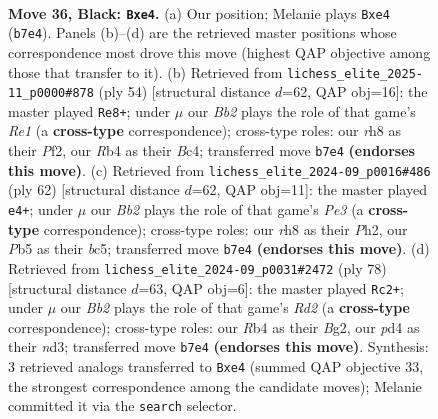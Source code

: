 \documentclass[11pt]{article}
\begin{document}
\begin{figure}[p]\centering
\begin{subfigure}{0.46\textwidth}\centering
\resizebox{\linewidth}{!}{%
\newchessgame
\chessboard[
  setfen={7R/1b3pp1/4p1k1/1p5p/1r1PBP1P/2N1P1P1/8/6K1 b - - 0 36},
  showmover=false,
  pgfstyle=straightmove, color=movearrow, markmove={b7-e4}
]}
\caption{}
\end{subfigure}\hfill
\begin{subfigure}{0.46\textwidth}\centering
\resizebox{\linewidth}{!}{%
\newchessgame
\chessboard[
  setfen={6k1/pp3pp1/2p2p2/2P5/1PBr1b2/7P/P4P1P/4R1K1 w - - 0 28},
  showmover=false,
  pgfstyle=straightmove, color=movearrow, markmove={e1-e8}
]}
\caption{}
\end{subfigure}
\\[4pt]
\begin{subfigure}{0.46\textwidth}\centering
\resizebox{\linewidth}{!}{%
\newchessgame
\chessboard[
  setfen={5r2/p1R5/1p3B1p/2bk2p1/P5P1/4PK2/5P1P/8 w - - 1 32},
  showmover=false,
  pgfstyle=straightmove, color=movearrow, markmove={e3-e4}
]}
\caption{}
\end{subfigure}\hfill
\begin{subfigure}{0.46\textwidth}\centering
\resizebox{\linewidth}{!}{%
\newchessgame
\chessboard[
  setfen={8/2k4p/1p4p1/1K3p2/PP1r4/3n2P1/3R1PBP/8 w - - 2 40},
  showmover=false,
  pgfstyle=straightmove, color=movearrow, markmove={d2-c2}
]}
\caption{}
\end{subfigure}
\caption{\textbf{Move 36, Black: \texttt{Bxe4}.} (a) Our position; Melanie plays \texttt{Bxe4} (\texttt{b7e4}). Panels (b)--(d) are the retrieved master positions whose correspondence most drove this move (highest QAP objective among those that transfer to it). (b) Retrieved from \texttt{lichess\_elite\_2025-11\_p0000\#878} (ply 54) [structural distance $d$=62, QAP obj=16]: the master played \texttt{Re8+}; under $\mu$ our \emph{Bb2} plays the role of that game's \emph{Re1} (a \textbf{cross-type} correspondence); cross-type roles: our \emph{r}h8 as their \emph{P}f2, our \emph{R}b4 as their \emph{B}c4; transferred move \texttt{b7e4} \textbf{(endorses this move)}. (c) Retrieved from \texttt{lichess\_elite\_2024-09\_p0016\#486} (ply 62) [structural distance $d$=62, QAP obj=11]: the master played \texttt{e4+}; under $\mu$ our \emph{Bb2} plays the role of that game's \emph{Pe3} (a \textbf{cross-type} correspondence); cross-type roles: our \emph{r}h8 as their \emph{P}h2, our \emph{P}b5 as their \emph{b}c5; transferred move \texttt{b7e4} \textbf{(endorses this move)}. (d) Retrieved from \texttt{lichess\_elite\_2024-09\_p0031\#2472} (ply 78) [structural distance $d$=63, QAP obj=6]: the master played \texttt{Rc2+}; under $\mu$ our \emph{Bb2} plays the role of that game's \emph{Rd2} (a \textbf{cross-type} correspondence); cross-type roles: our \emph{R}b4 as their \emph{B}g2, our \emph{p}d4 as their \emph{n}d3; transferred move \texttt{b7e4} \textbf{(endorses this move)}. Synthesis: 3 retrieved analogs transferred to \texttt{Bxe4} (summed QAP objective 33, the strongest correspondence among the candidate moves); Melanie committed it via the \texttt{search} selector.}
\label{fig:thought-m71}
\end{figure}
\end{document}
